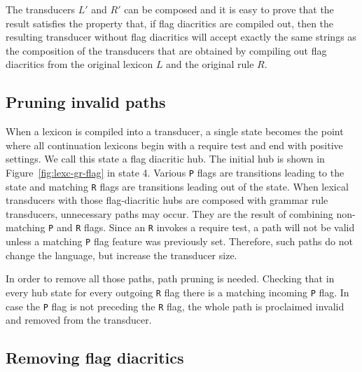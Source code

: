 \documentclass[10pt, a4paper]{article}
\begin{document}
The transducers $L'$ and $R'$ can be composed and it is easy to
prove that the result satisfies the property that, if flag diacritics
are compiled out, then the resulting transducer without flag
diacritics will accept exactly the same strings as the composition of
the transducers that are obtained by compiling out flag diacritics
from the original lexicon $L$ and the original rule $R$.



\subsection{Pruning invalid paths}

When a lexicon is compiled into a transducer, a single state becomes the point where all continuation lexicons begin with a require test and end with positive settings. We call this state a flag diacritic hub. The initial hub is shown in
Figure~\ref{fig:lexc-gr-flag} in state 4. Various \verb+P+ flags are transitions leading to the state and matching \verb+R+ flags are transitions leading out of the state. 
When lexical transducers with those flag-diacritic hubs are composed with grammar rule transducers, unnecessary paths may occur. 
They are the result of combining non-matching \verb+P+ and \verb+R+ flags. Since an \verb+R+ invokes a require test, 
a path will not be valid unless a matching \verb+P+ flag feature was previously set. 
Therefore, such paths do not change the language, but increase the transducer size.

In order to remove all those paths, path pruning is needed. Checking that in every hub state for every outgoing 
\verb+R+ flag there is a matching incoming \verb+P+ flag. In case the \verb+P+ flag is not preceding the \verb+R+ flag, 
the whole path is proclaimed invalid and removed from the transducer.





		

\subsection{Removing flag diacritics}
\label{removing}
\end{document}
